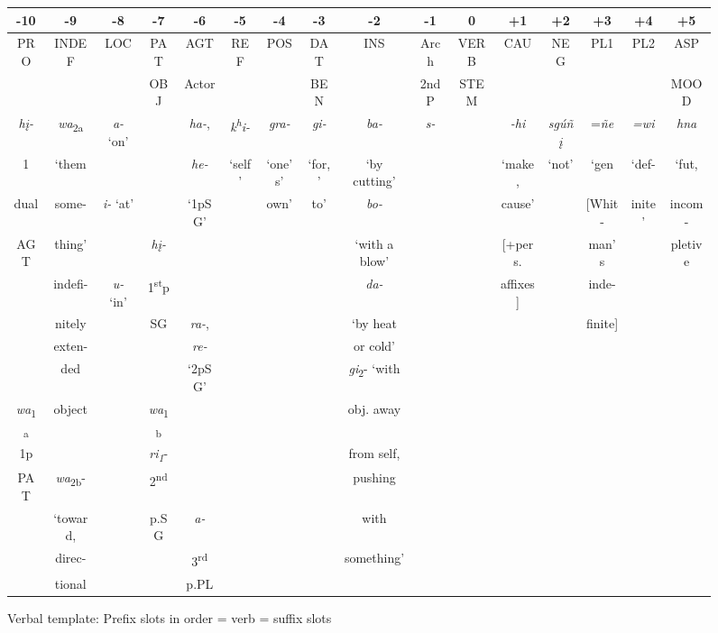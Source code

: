 \documentclass[output=paper]{LSP/langsci}
\begin{document}
\begin{sidewaysfigure}
\caption{Verbal template: Prefix slots in order = verb = suffix slots}
\scriptsize
\begin{tabular}{ | c | c | c | c | c | c | c | c | c | c | c | c | c | c | c | c |}
\hline
-10 & -9 & -8 & -7 & -6 & -5 & -4 & -3 & -2 & -1 & 0 & +1 & +2 & +3 & +4 & +5 \\
\hline
PRO & INDEF & LOC & PAT & AGT & REF & POS & DAT & INS & Arch & VERB & CAU & NEG & PL1 & PL2 & ASP \\
& & & OBJ & Actor & & & BEN & & 2ndP & STEM & & & & & MOOD \\
\hline
\textit{h\k{i}-} & \textit{wa}\textsubscript{2a} & \textit{a-} `on' &  & \textit{ha-}, & \textit{k\textsuperscript{h}i-} & \textit{gra-} & \textit{gi-} & \textit{ba-} & \textit{s-} & & \textit{-hi} & \textit{sg\'u\~n\k{i}} & =\textit{\~ne} & \textit{=wi} & \textit{hna} \\
1 & `them & & & \textit{he-} & `self' & `one's' & `for,' & `by cutting' & & & `make, & `not' & `gen & `def- & `fut, \\
dual & some- & \textit{i-} `at' & & `1pSG' & & own'& to' & \textit{bo-} & & & cause' & & [Whit- & inite' & incom- \\
AGT & thing' & & \textit{h\k{i}-} & & & & & `with a blow' & & & [+pers. & & man's & & pletive \\
& indefi- & \textit{u-} `in' & 1\textsuperscript{st}p & & & & & \textit{da-}  & & & affixes] & & inde- & & \\
& nitely & & SG & \textit{ra-}, & & & & `by heat & & & & & finite] & & \\
& exten- & & & \textit{re-} & & & & or cold' & & & & & & & \\
& ded & & & `2pSG' & & & &  \textit{gi}\textsubscript{2}- `with & & & & & & &  \\
\textit{wa}\textsubscript{1a} & object & & \textit{wa}\textsubscript{1b} &  & & & & obj. away & & & & & & & \\
1p & & & \textit{ri\textsubscript{1}}- & & & & & from self, & & & & & & & \\
PAT & \textit{wa}\textsubscript{2b}- & & 2\textsuperscript{nd} & & & & &  pushing & & & & & & &\\
&  `toward, & & p.SG & \textit{a-} & & & &  with & & & & & & & \\
& direc- & & & 3\textsuperscript{rd} & & & & something' & & & & & & & \\
& tional & & & p.PL & & & & & & & & & & & \\

\end{tabular}
\end{sidewaysfigure}
\end{document}
